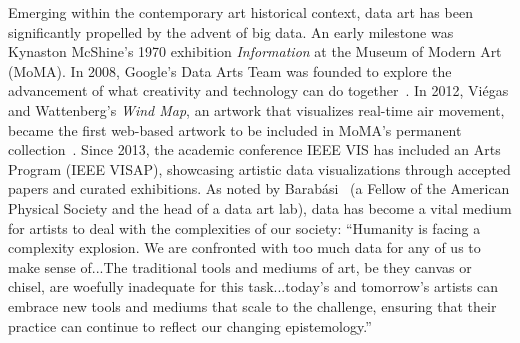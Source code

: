 
Emerging within the contemporary art historical context, data art has been significantly propelled by the advent of big data. An early milestone was Kynaston McShine's 1970 exhibition \textit{Information} at the Museum of Modern Art (MoMA). 
In 2008, Google’s Data Arts Team was founded to explore the advancement of what creativity and technology can do together~\cite{google}.
In 2012, Viégas and Wattenberg's \textit{Wind Map}, an artwork that visualizes real-time air movement, became the first web-based artwork to be included in MoMA's permanent collection~\cite{wind}.
Since 2013, the academic conference IEEE VIS has included an Arts Program (IEEE VISAP), showcasing artistic data visualizations through accepted papers and curated exhibitions. 
As noted by Barabási~\cite{dataism} (a Fellow of the American Physical Society and the head of a data art lab), data has become a vital medium for artists to deal with the complexities of our society: ``Humanity is facing a complexity explosion. We are confronted with too much data for any of us to make sense of...The traditional tools and mediums of art, be they canvas or chisel, are woefully inadequate for this task...today’s and tomorrow’s artists can embrace new tools and mediums that scale to the challenge, ensuring that their practice can continue to reflect our changing epistemology.''




